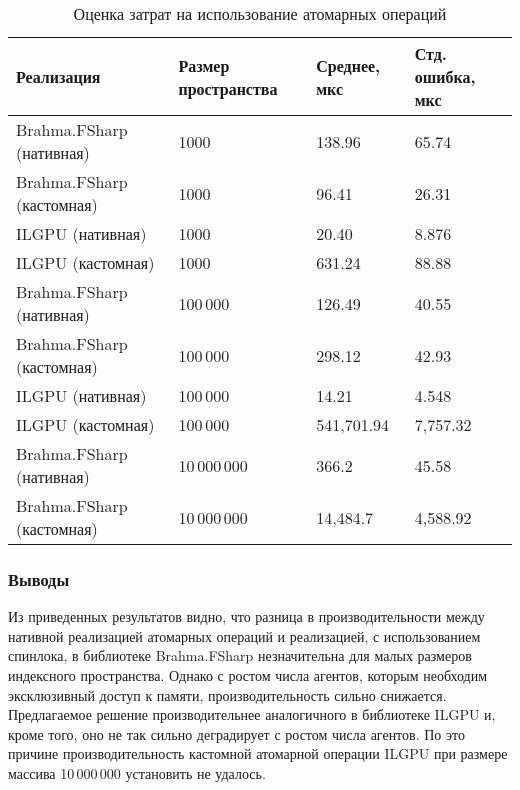 \begin{table}
    \begin{tabularx}{\textwidth}{|l|X|l|X|}
      \hline
      \textbf{Реализация} & \textbf{Размер пространства} & \textbf{Среднее, мкс} & \textbf{Стд. ошибка, мкс} \\
      \hline
      Brahma.FSharp (нативная) & 1000 & 138.96  & 65.74  \\
      Brahma.FSharp (кастомная) & 1000 & 96.41   & 26.31  \\
      ILGPU (нативная) & 1000 & 20.40  & 8.876   \\
      ILGPU (кастомная) & 1000 & 631.24  & 88.88  \\
      \hline
      Brahma.FSharp (нативная) & 100\,000 & 126.49   & 40.55  \\
      Brahma.FSharp (кастомная) & 100\,000 & 298.12   & 42.93   \\
      ILGPU (нативная) & 100\,000 & 14.21  & 4.548   \\
      ILGPU (кастомная) & 100\,000 & 541,701.94   & 7,757.32 \\
      \hline
      Brahma.FSharp (нативная) & 10\,000\,000 & 366.2 & 45.58    \\
      Brahma.FSharp (кастомная) & 10\,000\,000 & 14,484.7  & 4,588.92    \\
      \hline
    \end{tabularx}
  \caption{Оценка затрат на использование атомарных операций}
  \label{tab:atom}
\end{table}

\subsubsection{Выводы}
Из приведенных результатов видно, что разница в производительности между нативной реализацией атомарных операций и реализацией, с использованием спинлока, в библиотеке Brahma.FSharp незначительна для малых размеров индексного пространства. Однако с ростом числа агентов, которым необходим эксклюзивный доступ к памяти, производительность сильно снижается. Предлагаемое решение производительнее аналогичного в библиотеке ILGPU и, кроме того, оно не так сильно деградирует с ростом числа агентов. По это причине производительность кастомной атомарной операции ILGPU при размере массива 10\,000\,000 установить не удалось.


